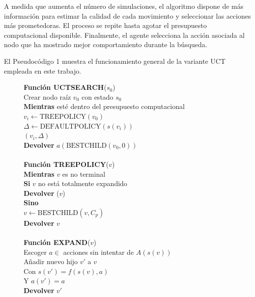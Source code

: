 \documentclass[conference,a4paper]{IEEEtran}
\begin{document}
A medida que aumenta el número de simulaciones, el algoritmo dispone de más información para estimar la calidad de cada movimiento y seleccionar las acciones más prometedoras. 
El proceso se repite hasta agotar el presupuesto computacional disponible. 
Finalmente, el agente selecciona la acción asociada al nodo que ha mostrado mejor comportamiento durante la búsqueda. 

El Pseudocódigo 1 muestra el funcionamiento general de la variante UCT empleada en este trabajo. 

\newpage

\begin{figure}[t]
  \noindent
  \begin{minipage}{\columnwidth}
    \begin{pseudo}[compact, left-margin=0pt, label-align=l]
      \textbf{Función UCTSEARCH}($s_0$) \\ 
      \> Crear nodo raíz $v_0$ con estado $s_0$ \\ 
      \> \textbf{Mientras} esté dentro del presupuesto computacional \\ 
      \> \> $v_i \leftarrow \text{TREEPOLICY}(v_0)$ \\ 
      \> \> $\Delta \leftarrow \text{DEFAULTPOLICY}(s(v_i))$ \\ 
      \> \> $(v_i, \Delta)$ \\ 
      \> \textbf{Devolver} $a(\text{BESTCHILD}(v_0, 0))$ \\ 

      \\

      \textbf{Función TREEPOLICY}($v$) \\ 
      \> \textbf{Mientras} $v$ es no terminal \\ 
      \> \> \textbf{Si} $v$ no está totalmente expandido \\ 
      \> \> \> \textbf{Devolver} ($v$) \\ 
      \> \> \textbf{Sino} \\ 
      \> \> \> $v \leftarrow \text{BESTCHILD}(v, C_p)$ \\ 
      \> \textbf{Devolver} $v$ \\ 

      \\

      \textbf{Función EXPAND}($v$) \\ 
      \> Escoger $a \in$ acciones sin intentar de $A(s(v))$ \\ 
      \> Añadir nuevo hijo $v'$ a $v$ \\ 
      \> \> Con $s(v') = f(s(v), a)$ \\ 
      \> \> Y $a(v') = a$ \\ 
      \> \textbf{Devolver} $v'$ \\ 


\end{pseudo}
\end{minipage}
\end{figure}
\end{document}
